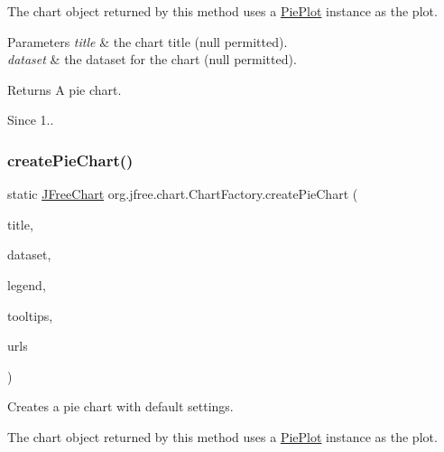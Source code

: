 The chart object returned by this method uses a \mbox{\hyperlink{}{Pie\+Plot}} instance as the plot.


\begin{DoxyParams}{Parameters}
{\em title} & the chart title ({\ttfamily null} permitted). \\
\hline
{\em dataset} & the dataset for the chart ({\ttfamily null} permitted).\\
\hline
\end{DoxyParams}
\begin{DoxyReturn}{Returns}
A pie chart.
\end{DoxyReturn}
\begin{DoxySince}{Since}
1.. 
\end{DoxySince}
\mbox{\label{classorg_1_1jfree_1_1chart_1_1_chart_factory_a1c32b9ffd3e9cf08821a96794193851e}} 
\subsubsection{\texorpdfstring{create\+Pie\+Chart()}{createPieChart()}\hspace{0.1cm}{\footnotesize\ttfamily [3/5]}}
{\footnotesize\ttfamily static \mbox{\hyperlink{classorg_1_1jfree_1_1chart_1_1_j_free_chart}{J\+Free\+Chart}} org.\+jfree.\+chart.\+Chart\+Factory.\+create\+Pie\+Chart (\begin{DoxyParamCaption}\item[{String}]{title,  }\item[{\mbox{\hyperlink{interfaceorg_1_1jfree_1_1data_1_1general_1_1_pie_dataset}{Pie\+Dataset}}}]{dataset,  }\item[{boolean}]{legend,  }\item[{boolean}]{tooltips,  }\item[{boolean}]{urls }\end{DoxyParamCaption})\hspace{0.3cm}{\ttfamily [static]}}

Creates a pie chart with default settings. 

The chart object returned by this method uses a \mbox{\hyperlink{}{Pie\+Plot}} instance as the plot.


